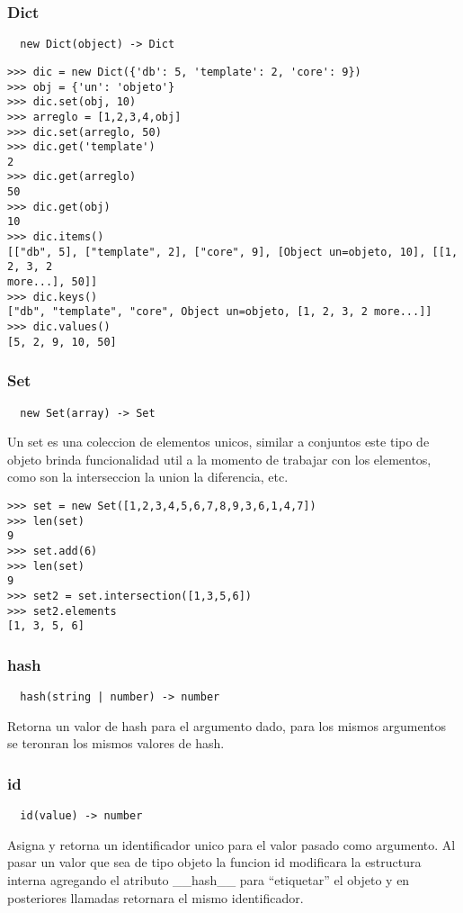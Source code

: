 \subsubsection*{Dict}
\begin{verbatim}
  new Dict(object) -> Dict
\end{verbatim}
\begin{lstlisting}[style=consola]
>>> dic = new Dict({'db': 5, 'template': 2, 'core': 9})
>>> obj = {'un': 'objeto'}
>>> dic.set(obj, 10)
>>> arreglo = [1,2,3,4,obj]
>>> dic.set(arreglo, 50)
>>> dic.get('template')
2
>>> dic.get(arreglo)
50
>>> dic.get(obj)
10
>>> dic.items()
[["db", 5], ["template", 2], ["core", 9], [Object un=objeto, 10], [[1, 2, 3, 2
more...], 50]]
>>> dic.keys()
["db", "template", "core", Object un=objeto, [1, 2, 3, 2 more...]]
>>> dic.values()
[5, 2, 9, 10, 50]
\end{lstlisting}

\subsubsection*{Set}
\begin{verbatim}
  new Set(array) -> Set
\end{verbatim}
Un set es una coleccion de elementos unicos, similar a conjuntos este tipo de
objeto brinda funcionalidad util a la momento de trabajar con los elementos,
como son la interseccion la union la diferencia, etc.
\begin{lstlisting}[style=consola]
>>> set = new Set([1,2,3,4,5,6,7,8,9,3,6,1,4,7])
>>> len(set)
9
>>> set.add(6)
>>> len(set)
9
>>> set2 = set.intersection([1,3,5,6])
>>> set2.elements
[1, 3, 5, 6]
\end{lstlisting}

\subsubsection*{hash}
\begin{verbatim}
  hash(string | number) -> number
\end{verbatim}
Retorna un valor de hash para el argumento dado, para los mismos argumentos se
teronran los mismos valores de hash.

\subsubsection*{id}
\begin{verbatim}
  id(value) -> number
\end{verbatim}
Asigna y retorna un identificador unico para el valor pasado como argumento.
Al pasar un valor que sea de tipo objeto la funcion id modificara la
estructura interna agregando el atributo __hash__ para ``etiquetar''
el objeto y en posteriores llamadas retornara el mismo identificador.

